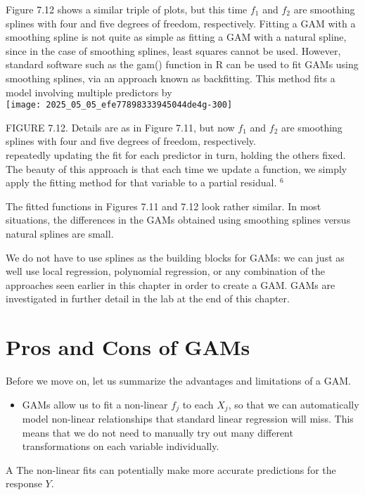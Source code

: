 \documentclass[10pt]{article}
\begin{document}
Figure 7.12 shows a similar triple of plots, but this time $f_{1}$ and $f_{2}$ are smoothing splines with four and five degrees of freedom, respectively. Fitting a GAM with a smoothing spline is not quite as simple as fitting a GAM with a natural spline, since in the case of smoothing splines, least squares cannot be used. However, standard software such as the gam() function in R can be used to fit GAMs using smoothing splines, via an approach known as backfitting. This method fits a model involving multiple predictors by\\
\texttt{[image: 2025\_05\_05\_efe77898333945044de4g-300]}

FIGURE 7.12. Details are as in Figure 7.11, but now $f_{1}$ and $f_{2}$ are smoothing splines with four and five degrees of freedom, respectively.\\
repeatedly updating the fit for each predictor in turn, holding the others fixed. The beauty of this approach is that each time we update a function, we simply apply the fitting method for that variable to a partial residual. ${ }^{6}$

The fitted functions in Figures 7.11 and 7.12 look rather similar. In most situations, the differences in the GAMs obtained using smoothing splines versus natural splines are small.

We do not have to use splines as the building blocks for GAMs: we can just as well use local regression, polynomial regression, or any combination of the approaches seen earlier in this chapter in order to create a GAM. GAMs are investigated in further detail in the lab at the end of this chapter.

\section*{Pros and Cons of GAMs}
Before we move on, let us summarize the advantages and limitations of a GAM.

\begin{itemize}
  \item GAMs allow us to fit a non-linear $f_{j}$ to each $X_{j}$, so that we can automatically model non-linear relationships that standard linear regression will miss. This means that we do not need to manually try out many different transformations on each variable individually.
\end{itemize}

A The non-linear fits can potentially make more accurate predictions for the response $Y$.
\end{document}
